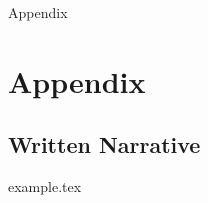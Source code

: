
Appendix


\cleardoublepage

\section{Appendix}

\subsection{Written Narrative} \label{app:example}
{example.tex}


\newpage